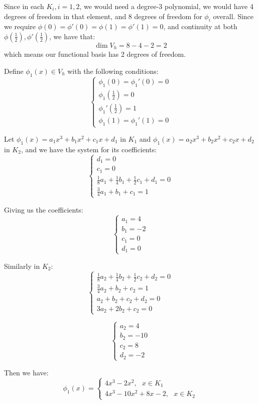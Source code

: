 \documentclass[12pt]{article} %
\begin{document}
Since in each $K_i, i= 1,2$, we would need a degree-3 polynomial, we would have 4 degrees of freedom in that element, and 8 degrees of freedom for $\phi_i$ overall. Since we require $\phi(0)=\phi'(0)=\phi(1)=\phi'(1) = 0$, and continuity at both $\phi(\frac12),\phi'(\frac12)$, we have that:
$$
	\dim V_h = 8 - 4 - 2 = 2
$$ which means our functional basis has 2 degrees of freedom.

Define $\phi_1(x)\in V_h$ with the following conditions:
$$
	\begin{cases}
		\phi_1(0) = \phi_1'(0) = 0\\
		\phi_1(\frac12) = 0\\
		\phi_1'(\frac12) = 1\\
		\phi_{1}(1) = \phi_1'(1) = 0	
	\end{cases}
$$

Let $\phi_1(x) = a_1x^3 + b_1x^2 + c_1x + d_1$ in $K_1$ and $\phi_1(x) = a_2x^3 + b_2x^2 + c_2x + d_2$ in $K_2$, and we have the system for its coefficients:
$$
	\begin{cases}
		d_1 = 0\\
		c_1 = 0\\
		\frac18 a_1 + \frac14 b_1 + \frac12 c_1 + d_1 = 0\\
		\frac34 a_1 + b_1 + c_1 = 1
	\end{cases}
$$

Giving us the coefficients:
$$
	\begin{cases}
		a_1 = 4\\
		b_1 = -2\\
		c_1 = 0\\
		d_1 = 0
	\end{cases}
$$

Similarly in $K_2$:
$$
	\begin{cases}
		\frac18 a_2 + \frac14 b_2 + \frac12 c_2 + d_2 = 0 \\
		\frac34 a_2 + b_2 + c_2 = 1 \\
		a_2 + b_2 + c_2 + d_2 = 0\\
		3a_2 + 2b_2 + c_2 = 0
	\end{cases}
$$

$$
	\begin{cases}
		a_2 = 4\\
		b_2= -10\\
		c_2 = 8\\
		d_2 = -2
	\end{cases}
$$

Then we have:
$$
	\phi_1(x) = 
	\begin{cases}
		4x^3 - 2x^2, \text{ $x \in K_1$}\\
		4x^3 -10x^2 + 8x - 2, \text{ $x\in K_2$}
	\end{cases}
$$
\end{document}
